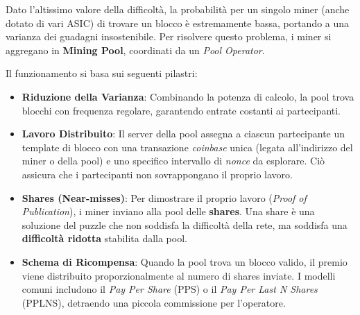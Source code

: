 Dato l'altissimo valore della difficoltà, la probabilità per un singolo miner (anche dotato di vari ASIC) di trovare un blocco è estremamente bassa, portando a una varianza dei guadagni insostenibile. Per risolvere questo problema, i miner si aggregano in \textbf{Mining Pool}, coordinati da un \textit{Pool Operator}.



Il funzionamento si basa sui seguenti pilastri:
\begin{itemize}
    \item \textbf{Riduzione della Varianza}: Combinando la potenza di calcolo, la pool trova blocchi con frequenza regolare, garantendo entrate costanti ai partecipanti.
    \item \textbf{Lavoro Distribuito}: Il server della pool assegna a ciascun partecipante un template di blocco con una transazione \textit{coinbase} unica (legata all'indirizzo del miner o della pool) e uno specifico intervallo di \textit{nonce} da esplorare. Ciò assicura che i partecipanti non sovrappongano il proprio lavoro.
    \item \textbf{Shares (Near-misses)}: Per dimostrare il proprio lavoro (\textit{Proof of Publication}), i miner inviano alla pool delle \textbf{shares}. Una share è una soluzione del puzzle che non soddisfa la difficoltà della rete, ma soddisfa una \textbf{difficoltà ridotta} stabilita dalla pool.
    \item \textbf{Schema di Ricompensa}: Quando la pool trova un blocco valido, il premio viene distribuito proporzionalmente al numero di shares inviate. I modelli comuni includono il \textit{Pay Per Share} (PPS) o il \textit{Pay Per Last N Shares} (PPLNS), detraendo una piccola commissione per l'operatore.
\end{itemize}